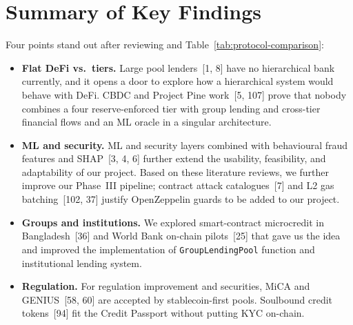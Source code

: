 \section{Summary of Key Findings}
\label{sec:lit-key-findings}

Four points stand out after reviewing and Table~\ref{tab:protocol-comparison}:

\begin{itemize}[noitemsep]
\item \textbf{Flat DeFi vs.\ tiers.} Large pool lenders~[1, 8] have no hierarchical bank currently, and it opens a door to explore how a hierarchical system would behave with DeFi. CBDC and Project Pine work~[5, 107] prove that nobody combines a four reserve-enforced tier with group lending and cross-tier financial flows and an ML oracle in a singular architecture.
\item \textbf{ML and security.} ML and security layers combined with behavioural fraud features and SHAP~[3, 4, 6] further extend the usability, feasibility, and adaptability of our project. Based on these literature reviews, we further improve our Phase~III pipeline; contract attack catalogues~[7] and L2 gas batching~[102, 37] justify OpenZeppelin guards to be added to our project.
\item \textbf{Groups and institutions.} We explored smart-contract microcredit in Bangladesh~[36] and World Bank on-chain pilots~[25] that gave us the idea and improved the implementation of \texttt{GroupLendingPool} function and institutional lending system.
\item \textbf{Regulation.} For regulation improvement and securities, MiCA and GENIUS~[58, 60] are accepted by stablecoin-first pools. Soulbound credit tokens~[94] fit the Credit Passport without putting KYC on-chain.
\end{itemize}

